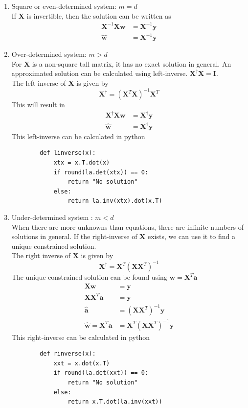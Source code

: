 \documentclass{article}
\newcommand{\matr}[1]{\mathbf{#1}}
\begin{document}
\begin{enumerate}
\begin{table}[ht]
    \end{table}
    \item Square or even-determined system: $m=d$ \\
    If $\matr{X}$ is invertible, then the solution can be written as 
    \begin{align*}
        \matr{X}^{-1}\matr{X}\matr{w} &= \matr{X}^{-1}\matr{y} \\
        \hat{\matr{w}} &= \matr{X}^{-1}\matr{y}
    \end{align*}
    \item Over-determined system: $m>d$ \\
    For $\matr{X}$ is a non-square tall matrix, it has no exact solution in general. An approximated solution can be calculated using left-inverse. $\matr{X}^{\dagger}\matr{X} = \matr{I}$. \\
    The left inverse of $\matr{X}$ is given by 
    \[\matr{X}^{\dagger} = (\matr{X}^T\matr{X})^{-1}\matr{X}^T\]
    This will result in
    \begin{align*}
        \matr{X}^{\dagger}\matr{X}\matr{w} &= \matr{X}^{\dagger}\matr{y} \\
        \hat{\matr{w}} &= \matr{X}^{\dagger}\matr{y}
    \end{align*}
    This left-inverse can be calculated in python 
    \begin{verbatim}
        def linverse(x):
            xtx = x.T.dot(x)
            if round(la.det(xtx)) == 0:
                return "No solution"
            else:
                return la.inv(xtx).dot(x.T)
    \end{verbatim}
    \item Under-determined system : $m<d$ \\
    When there are more unknowns than equations, there are infinite numbers of solutions in general. If the right-inverse of $\matr{X}$ exists, we can use it to find a unique constrained solution.\\
    The right inverse of $\matr{X}$ is given by
    \[\matr{X}^{\dagger}=\matr{X}^T(\matr{X}\matr{X}^T)^{-1}\]
    The unique constrained solution can be found using $\matr{w} = \matr{X}^T\matr{a}$
    \begin{align*}
        \matr{X}\matr{w} &= \matr{y} \\
        \matr{X}\matr{X}^T\matr{a} &= \matr{y} \\
        \hat{\matr{a}} & = (\matr{X}\matr{X}^T)^{-1}\matr{y}\\
        \hat{\matr{w}} = \matr{X}^T\matr{a} & = \matr{X}^T (\matr{X}\matr{X}^T)^{-1}\matr{y}
    \end{align*}
    This right-inverse can be calculated in python
    \begin{verbatim}
        def rinverse(x):
            xxt = x.dot(x.T)
            if round(la.det(xxt)) == 0:
                return "No solution"
            else:
                return x.T.dot(la.inv(xxt))
    \end{verbatim}
\end{enumerate}
\end{document}
